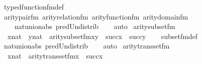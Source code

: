 \begin{isabellebody}
\endisadelimproof
%
\isatagproof
{}\isamarkupfalse%
\ typed{\isacharunderscore}{\kern0pt}function{\isacharunderscore}{\kern0pt}fm{\isacharunderscore}{\kern0pt}def\isanewline
\ \ \isamarkupfalse%
\ arity{\isacharunderscore}{\kern0pt}pair{\isacharunderscore}{\kern0pt}fm\ arity{\isacharunderscore}{\kern0pt}relation{\isacharunderscore}{\kern0pt}fm\ arity{\isacharunderscore}{\kern0pt}function{\isacharunderscore}{\kern0pt}fm\ arity{\isacharunderscore}{\kern0pt}domain{\isacharunderscore}{\kern0pt}fm\ \isanewline
\ \ \ \ nat{\isacharunderscore}{\kern0pt}union{\isacharunderscore}{\kern0pt}abs{}\ pred{\isacharunderscore}{\kern0pt}Un{\isacharunderscore}{\kern0pt}distrib\isanewline
\ \ \isamarkupfalse%
\ auto%
\endisatagproof
{\isafoldproof}%
%
\isadelimproof
\isanewline
%
\endisadelimproof
\isanewline
\isanewline
{}\isamarkupfalse%
\ arity{\isacharunderscore}{\kern0pt}subset{\isacharunderscore}{\kern0pt}fm\ {\isacharcolon}{\kern0pt}\ \isanewline
\ \ {\isachardoublequoteopen}{\isasymlbrakk}x{\isasymin}nat\ {\isacharsemicolon}{\kern0pt}\ y{\isasymin}nat{\isasymrbrakk}\ {\isasymLongrightarrow}\ arity{\isacharparenleft}{\kern0pt}subset{\isacharunderscore}{\kern0pt}fm{\isacharparenleft}{\kern0pt}x{\isacharcomma}{\kern0pt}y{\isacharparenright}{\kern0pt}{\isacharparenright}{\kern0pt}\ {\isacharequal}{\kern0pt}\ succ{\isacharparenleft}{\kern0pt}x{\isacharparenright}{\kern0pt}\ {\isasymunion}\ succ{\isacharparenleft}{\kern0pt}y{\isacharparenright}{\kern0pt}{\isachardoublequoteclose}\isanewline
%
\isadelimproof
\ \ %
\endisadelimproof
%
\isatagproof
{}\isamarkupfalse%
\ subset{\isacharunderscore}{\kern0pt}fm{\isacharunderscore}{\kern0pt}def\ \isanewline
\ \ \isamarkupfalse%
\ nat{\isacharunderscore}{\kern0pt}union{\isacharunderscore}{\kern0pt}abs{}\ pred{\isacharunderscore}{\kern0pt}Un{\isacharunderscore}{\kern0pt}distrib\isanewline
\ \ \isamarkupfalse%
\ auto%
\endisatagproof
{\isafoldproof}%
%
\isadelimproof
\isanewline
%
\endisadelimproof
\isanewline
{}\isamarkupfalse%
\ arity{\isacharunderscore}{\kern0pt}transset{\isacharunderscore}{\kern0pt}fm\ {\isacharcolon}{\kern0pt}\isanewline
\ \ {\isachardoublequoteopen}{\isasymlbrakk}x{\isasymin}nat{\isasymrbrakk}\ {\isasymLongrightarrow}\ arity{\isacharparenleft}{\kern0pt}transset{\isacharunderscore}{\kern0pt}fm{\isacharparenleft}{\kern0pt}x{\isacharparenright}{\kern0pt}{\isacharparenright}{\kern0pt}\ {\isacharequal}{\kern0pt}\ succ{\isacharparenleft}{\kern0pt}x{\isacharparenright}{\kern0pt}{\isachardoublequoteclose}\isanewline

\end{isabellebody}
